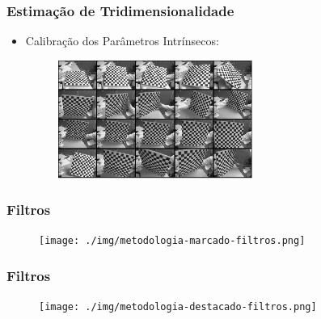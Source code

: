 \documentclass[brazil]{beamer}
\begin{document}
\begin{frame}
\frametitle{Estimação de Tridimensionalidade}
  \begin{itemize}
      \item Calibração dos Parâmetros Intrínsecos:
      \begin{figure}
        \centering
        \includegraphics[width = 0.6\textwidth, keepaspectratio]{./img/TG_calib_images.png}
      \end{figure}
  \end{itemize} 
\end{frame}

\begin{frame}
\frametitle{Filtros}
        \begin{figure}
            \centering
            \texttt{[image: ./img/metodologia-marcado-filtros.png]}
      \end{figure}
\end{frame}

\begin{frame}
\frametitle{Filtros}      

 \begin{figure}
            \centering
            \texttt{[image: ./img/metodologia-destacado-filtros.png]}
      \end{figure}
\end{frame}
\end{document}
